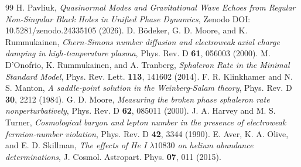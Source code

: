 \documentclass[11pt,a4paper]{article}
\begin{document}
\begin{thebibliography}{99}
 H. Pavliuk, \textit{Quasinormal Modes and Gravitational Wave Echoes from Regular Non-Singular Black Holes in Unified Phase Dynamics}, Zenodo DOI: 10.5281/zenodo.24335105 (2026).
 D. B\"odeker, G. D. Moore, and K. Rummukainen, \textit{Chern-Simons number diffusion and electroweak axial charge damping in high-temperature plasma}, Phys. Rev. D \textbf{61}, 056003 (2000).
 M. D'Onofrio, K. Rummukainen, and A. Tranberg, \textit{Sphaleron Rate in the Minimal Standard Model}, Phys. Rev. Lett. \textbf{113}, 141602 (2014).
 F. R. Klinkhamer and N. S. Manton, \textit{A saddle-point solution in the Weinberg-Salam theory}, Phys. Rev. D \textbf{30}, 2212 (1984).
 G. D. Moore, \textit{Measuring the broken phase sphaleron rate nonperturbatively}, Phys. Rev. D \textbf{62}, 085011 (2000).
 J. A. Harvey and M. S. Turner, \textit{Cosmological baryon and lepton number in the presence of electroweak fermion-number violation}, Phys. Rev. D \textbf{42}, 3344 (1990).
 E. Aver, K. A. Olive, and E. D. Skillman, \textit{The effects of He I $\lambda10830$ on helium abundance determinations}, J. Cosmol. Astropart. Phys. \textbf{07}, 011 (2015).
\end{thebibliography}
\end{document}
